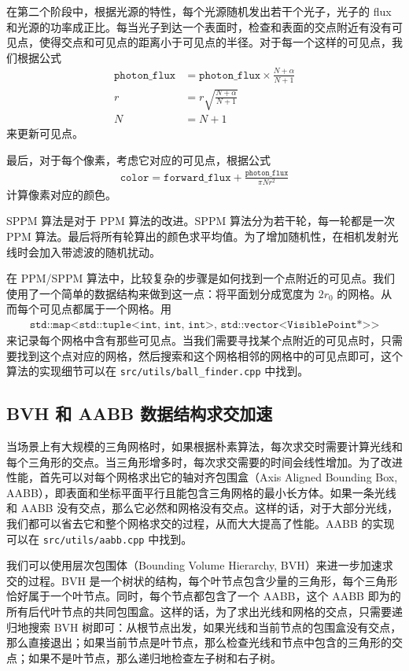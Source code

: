 \documentclass[cn]{report}
\let\t\texttt
\begin{document}
    在第二个阶段中，根据光源的特性，每个光源随机发出若干个光子，光子的 flux 和光源的功率成正比。每当光子到达一个表面时，检查和表面的交点附近有没有可见点，使得交点和可见点的距离小于可见点的半径。对于每一个这样的可见点，我们根据公式
    \begin{align}
        \t{photon\_flux} &= \t{photon\_flux} \times \frac{N + \alpha}{N + 1} \\
        r &= r \sqrt{\frac{N + \alpha}{N + 1}} \\
        N &= N + 1
    \end{align}
    来更新可见点。

    最后，对于每个像素，考虑它对应的可见点，根据公式 \begin{align}
        \t{color} = \t{forward\_flux} + \frac{\t{photon\_flux}}{\pi N r^2}
    \end{align} 计算像素对应的颜色。

    SPPM 算法是对于 PPM 算法的改进。SPPM 算法分为若干轮，每一轮都是一次 PPM 算法。最后将所有轮算出的颜色求平均值。为了增加随机性，在相机发射光线时会加入带滤波的随机扰动。

    在 PPM/SPPM 算法中，比较复杂的步骤是如何找到一个点附近的可见点。我们使用了一个简单的数据结构来做到这一点：将平面划分成宽度为 $2r_0$ 的网格。从而每个可见点都属于一个网格。用 \begin{align}\t{std::map<std::tuple<int, int, int>, std::vector<VisiblePoint*>>}\end{align} 来记录每个网格中含有那些可见点。当我们需要寻找某个点附近的可见点时，只需要找到这个点对应的网格，然后搜索和这个网格相邻的网格中的可见点即可，这个算法的实现细节可以在 \t{src/utils/ball\_finder.cpp} 中找到。

    \subsection{BVH 和 AABB 数据结构求交加速}
    当场景上有大规模的三角网格时，如果根据朴素算法，每次求交时需要计算光线和每个三角形的交点。当三角形增多时，每次求交需要的时间会线性增加。为了改进性能，首先可以对每个网格求出它的轴对齐包围盒（Axis Aligned Bounding Box, AABB），即表面和坐标平面平行且能包含三角网格的最小长方体。如果一条光线和 AABB 没有交点，那么它必然和网格没有交点。这样的话，对于大部分光线，我们都可以省去它和整个网格求交的过程，从而大大提高了性能。AABB 的实现可以在 \t{src/utils/aabb.cpp} 中找到。

    我们可以使用层次包围体（Bounding Volume Hierarchy, BVH）来进一步加速求交的过程。BVH 是一个树状的结构，每个叶节点包含少量的三角形，每个三角形恰好属于一个叶节点。同时，每个节点都包含了一个 AABB，这个 AABB 即为的所有后代叶节点的共同包围盒。这样的话，为了求出光线和网格的交点，只需要递归地搜索 BVH 树即可：从根节点出发，如果光线和当前节点的包围盒没有交点，那么直接退出；如果当前节点是叶节点，那么检查光线和节点中包含的三角形的交点；如果不是叶节点，那么递归地检查左子树和右子树。
\end{document}
